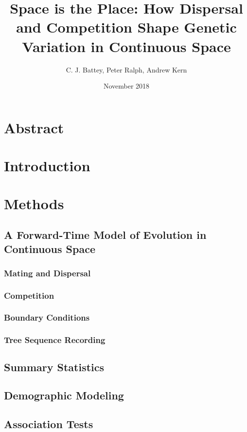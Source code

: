 \documentclass[12pt]{amsart}
\title{ Space is the Place: How Dispersal and Competition Shape Genetic Variation in Continuous Space }
\author{C. J. Battey, Peter Ralph, Andrew Kern}
\date{November 2018} %
\begin{document}
\maketitle
\tableofcontents

\section{Abstract}

\section{Introduction} %

\section{Methods}
\subsection{ A Forward-Time Model of Evolution in Continuous Space }

\subsubsection{ Mating and Dispersal } 

\subsubsection{ Competition } 

\subsubsection{ Boundary Conditions } 

\subsubsection{ Tree Sequence Recording } 

\subsection{ Summary Statistics } 

\subsection{ Demographic Modeling }

\subsection{ Association Tests } 
\end{document}
